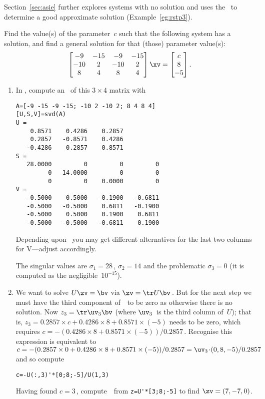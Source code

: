 Section~\ref{sec:asie} further explores systems with no solution and uses the \svd\ to determine a good approximate solution (Example~\ref{eg:rstp3}).



\begin{example} \label{eg:3x4findc}
Find the value(s) of the parameter~\(c\) such that the following system has a solution, and find a general solution for that (those) parameter value(s):
\begin{equation*}
\begin{bmatrix} -9&-15&-9&-15
\\-10&2&-10&2
\\8&4&8&4 \end{bmatrix}\xv=
\begin{bmatrix} c\\8\\-5 \end{bmatrix}.
\end{equation*}
\begin{solution} 
\begin{enumerate}
\item In \script, compute an \svd\  of this \(3\times 4\) matrix with 
\setbox\ajrqrbox\hbox{}%
\marginpar{\usebox{\ajrqrbox\\[2ex]}}%
\begin{verbatim}
A=[-9 -15 -9 -15; -10 2 -10 2; 8 4 8 4]
[U,S,V]=svd(A)
U =
    0.8571    0.4286    0.2857
    0.2857   -0.8571    0.4286
   -0.4286    0.2857    0.8571
S =
   28.0000         0         0         0
         0   14.0000         0         0
         0         0    0.0000         0
V =
   -0.5000    0.5000   -0.1900   -0.6811
   -0.5000   -0.5000    0.6811   -0.1900
   -0.5000    0.5000    0.1900    0.6811
   -0.5000   -0.5000   -0.6811    0.1900
\end{verbatim}
\begin{aside}
Depending upon \script\ you may get different alternatives for the last two columns for V---adjust accordingly.
\end{aside}%
The singular values are \(\sigma_1=28\)\,, \(\sigma_2=14\) and the problematic \(\sigma_3=0\) (it is computed as the negligible~\(10^{-15}\)).

\item We want to solve \(U\zv=\bv\) via \(\zv=\tr U\bv\)\,.  
But for the next step we must have the third component of~\zv\ to be zero as otherwise there is no solution.  
Now \(z_3=\tr\uv_3\bv\) (where \(\uv_3\)~is the third column of~\(U\)); that is, \(z_3=0.2857\times c +0.4286\times8 +0.8571\times(-5)\) needs to be zero, which requires \(c=-(0.4286\times8 +0.8571\times(-5))/0.2857\)\,.  
Recognise this expression is equivalent to \(c=-(0.2857\times0+0.4286\times8 +0.8571\times(-5))/0.2857=\uv_3\cdot(0,8,-5)/0.2857\) and so compute
\begin{verbatim}
c=-U(:,3)'*[0;8;-5]/U(1,3)
\end{verbatim}
Having found \(c=3\)\,, compute~\zv\ from \verb|z=U'*[3;8;-5]| to find \(\zv=(7,-7,0)\).


\end{enumerate}
\end{solution}
\end{example}
